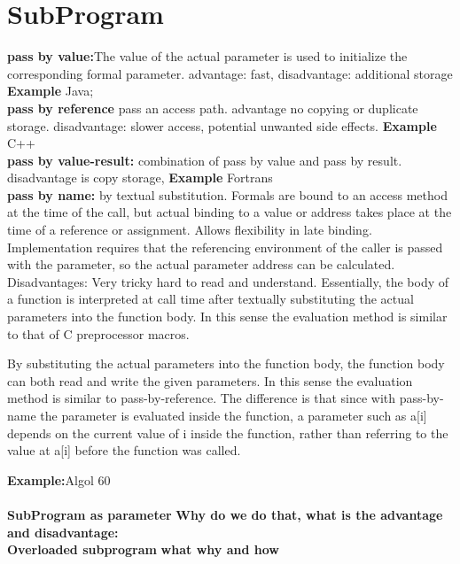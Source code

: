 \section{SubProgram}
\textbf{pass by value:}The value of the actual parameter is used to initialize the corresponding formal parameter. advantage: fast, disadvantage: additional storage
\textbf{Example} Java;\\
\textbf{pass by reference} pass an access path. advantage no copying or duplicate storage. disadvantage: slower access, potential unwanted side effects.
\textbf{Example} C++\\
\textbf{pass by value-result:} combination of pass by value and pass by result. disadvantage is copy storage, 
\textbf{Example} Fortrans\\
\textbf{pass by name:} by textual substitution. Formals are bound to an access method at the time of the call, but actual binding to a value or address takes place at the time of a reference or assignment. Allows flexibility in late binding. Implementation requires that the referencing environment of the caller is passed with the parameter, so the actual parameter address can be calculated. Disadvantages: Very tricky hard to read and understand. Essentially, the body of a function is interpreted at call time after textually substituting the actual parameters into the function body. In this sense the evaluation method is similar to that of C preprocessor macros.

By substituting the actual parameters into the function body, the function body can both read and write the given parameters. In this sense the evaluation method is similar to pass-by-reference. The difference is that since with pass-by-name the parameter is evaluated inside the function, a parameter such as a[i] depends on the current value of i inside the function, rather than referring to the value at a[i] before the function was called.


\textbf{Example:}Algol 60 \\

\\

\textbf{SubProgram as parameter}
\textbf{Why do we do that, what is the advantage and disadvantage:}\\

\textbf{Overloaded subprogram}
\textbf{what why and how}